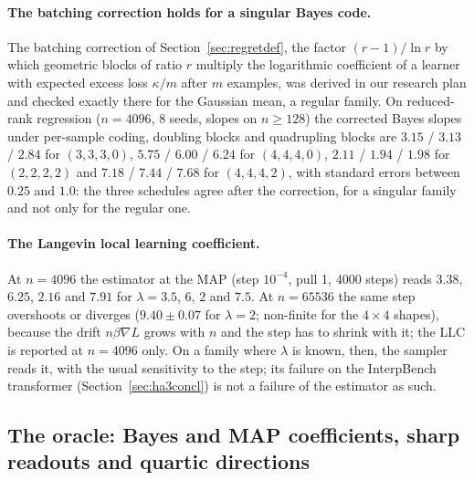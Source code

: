 \documentclass[11pt,a4paper]{article}
\begin{document}
\paragraph{The batching correction holds for a singular Bayes code.} The batching correction of Section~\ref{sec:regretdef}, the factor $(r-1)/\ln r$ by which geometric blocks of ratio $r$ multiply the logarithmic coefficient of a learner with expected excess loss $\kappa/m$ after $m$ examples, was derived in our research plan and checked exactly there for the Gaussian mean, a regular family. On reduced-rank regression ($n=4096$, 8 seeds, slopes on $n\ge128$) the corrected Bayes slopes under per-sample coding, doubling blocks and quadrupling blocks are $3.15$ / $3.13$ / $2.84$ for $(3,3,3,0)$, $5.75$ / $6.00$ / $6.24$ for $(4,4,4,0)$, $2.11$ / $1.94$ / $1.98$ for $(2,2,2,2)$ and $7.18$ / $7.44$ / $7.68$ for $(4,4,4,2)$, with standard errors between $0.25$ and $1.0$: the three schedules agree after the correction, for a singular family and not only for the regular one.

\paragraph{The Langevin local learning coefficient.} At $n=4096$ the estimator at the MAP (step $10^{-4}$, pull 1, 4000 steps) reads $3.38$, $6.25$, $2.16$ and $7.91$ for $\lambda=3.5$, $6$, $2$ and $7.5$. At $n=65536$ the same step overshoots or diverges ($9.40\pm0.07$ for $\lambda=2$; non-finite for the $4\times4$ shapes), because the drift $n\beta\nabla L$ grows with $n$ and the step has to shrink with it; the LLC is reported at $n=4096$ only. On a family where $\lambda$ is known, then, the sampler reads it, with the usual sensitivity to the step; its failure on the InterpBench transformer (Section~\ref{sec:ha3concl}) is not a failure of the estimator as such.

\subsection{The oracle: Bayes and MAP coefficients, sharp readouts and quartic directions}
\label{sec:coef:oracle}
\end{document}
